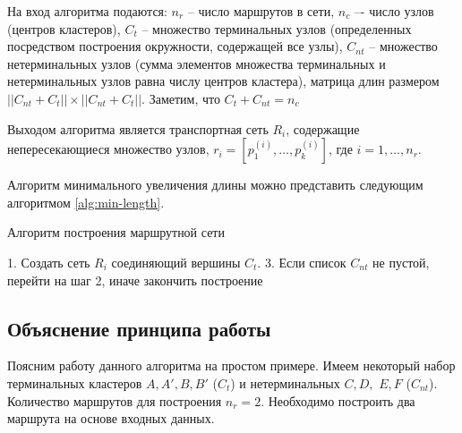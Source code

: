 На вход алгоритма подаются: \( n_r \) -- число маршрутов в сети, \( n_c \) –- число узлов (центров 
кластеров), \( C_t \) – множество терминальных узлов (определенных посредством построения окружности, 
содержащей все узлы), \( C_{nt} \) -- множество нетерминальных узлов (сумма элементов множества терминальных 
и нетерминальных узлов равна числу центров кластера), матрица длин размером 
\( ||{C_{nt}} + {C_{t}}|| \times ||{C_{nt}} + {C_{t}}|| \). Заметим, что \( C_t + C_{nt} = n_c \)

Выходом алгоритма является транспортная сеть \( R_i \), содержащие непересекающиеся множество узлов, 
\( r_{i} = [p_{1}^{(i)}, \dots, p_{k}^{(i)}] \), где \( i = 1, \dots, n_r \). 

Алгоритм минимального увеличения длины можно представить следующим алгоритмом \ref{alg:min-length}.
\begin{algorithm}[ht!]
    \caption{Алгоритм построения маршрутной сети}
    1. Создать сеть \( R_i \) соединяющий вершины \( C_t \). 
    3. Если список \( C_{nt} \) не пустой, перейти на шаг 2, иначе закончить построение\;
    \label{alg:min-length}
\end{algorithm}

\subsection{Объяснение принципа работы}
Поясним работу данного алгоритма на простом примере. Имеем некоторый набор терминальных кластеров 
\( A, A', B, B' \) (\( C_t \)) и нетерминальных \( C, D, \) \( E, F \) (\( C_{nt} \)). Количество маршрутов 
для построения \( n_r = 2 \). Необходимо построить два маршрута на основе входных данных.

